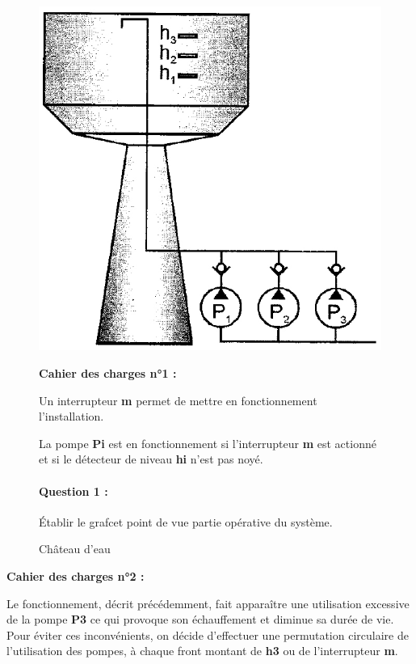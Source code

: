 \begin{figure}[!h]
 \begin{minipage}{0.4\linewidth}
  \begin{center}
   \includegraphics[width=0.9\linewidth]{img/Chateau_schema.png}
   \caption{Château d'eau}
   \label{img4}
  \end{center}
 \end{minipage}
 \hfill
 \begin{minipage}{0.55\linewidth}
  \textbf{Cahier des charges n°1 :}

  Un interrupteur \textbf{m} permet de mettre en fonctionnement l'installation.

  La pompe \textbf{Pi} est en fonctionnement si l'interrupteur \textbf{m} est actionné et si le détecteur de niveau \textbf{hi} n'est pas noyé.

 \paragraph{Question 1 :} Établir le grafcet point de vue partie opérative du système.
  
 \end{minipage}
\end{figure}

\textbf{Cahier des charges n°2 :}

Le fonctionnement, décrit précédemment, fait apparaître une utilisation excessive de la pompe \textbf{P3} ce qui provoque son échauffement et diminue sa durée de vie. Pour éviter ces inconvénients, on décide d'effectuer une permutation circulaire de l'utilisation des pompes, à chaque front montant de \textbf{h3} ou de l'interrupteur \textbf{m}.

